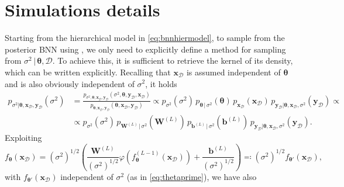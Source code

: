 \documentclass[a4paper, 11pt, reqno]{amsart}
\theoremstyle{plain}
\theoremstyle{remark}
\theoremstyle{definition}
\newcommand{\given}{\, | \,}
\newcommand{\train}{\mathcal{D}}
\begin{document}
\section{Simulations details} \label{sec:simulationsdetails}

Starting from the hierarchical model in \cref{eq:bnnhiermodel}, to sample from the posterior BNN using , we only need to explicitly define a method for sampling from $\sigma^2 \given \bm{\theta}, \train$. 
To achieve this, it is sufficient to retrieve the kernel of its density, which can be written explicitly. 
Recalling that $\bm{x}_{\mathcal{D}}$ is assumed independent of $\bm{\theta}$ and is also obviously independent of $\sigma^2$, it holds
\begin{equation} \label{eq:conditionaldistsigmaprod}
	\begin{aligned}
		p_{\sigma^2 | \bm{\theta}, \bm{x}_{\mathcal{D}}, \bm{y}_{\mathcal{D}}}(\sigma^2) & = \frac{p_{\sigma^2, \bm{\theta}, \bm{x}_{\mathcal{D}}, \bm{y}_{\mathcal{D}}}(\sigma^2, \bm{\theta}, \bm{y}_{\mathcal{D}}, \bm{x}_{\mathcal{D}})}{p_{\bm{\theta}, \bm{x}_{\mathcal{D}}, \bm{y}_{\mathcal{D}}}(\bm{\theta}, \bm{x}_{\mathcal{D}}, \bm{y}_{\mathcal{D}})} \propto p_{\sigma^2}(\sigma^2) \, p_{\bm{\theta} \given \sigma^2}(\bm{\theta}) \, p_{\bm{x}_{\mathcal{D}}}(\bm{x}_{\mathcal{D}}) \, p_{\bm{y}_{\mathcal{D}} | \bm{\theta}, \bm{x}_{\mathcal{D}}, \sigma^2}(\bm{y}_{\mathcal{D}}) \propto \\
		& \propto p_{\sigma^2}(\sigma^2) \, p_{\bm{W}^{(L)} \given \sigma^2}\left(\bm{W}^{(L)}\right) \, p_{\bm{b}^{(L)} \given \sigma^2}\left(\bm{b}^{(L)}\right) \,  p_{\bm{y}_{\mathcal{D}} | \bm{\theta}, \bm{x}_{\mathcal{D}}, \sigma^2}(\bm{y}_{\mathcal{D}}).
	\end{aligned}
\end{equation}
Exploiting
\begin{equation*}
	f_{\bm{\theta}}(\bm{x}_{\mathcal{D}}) = \left(\sigma^2\right)^{1/2} \left(\frac{\bm{W}^{(L)}}{\left(\sigma^2\right)^{1/2}} \varphi\left(f^{(L - 1)}_{\bm{\theta}}(\bm{x}_{\mathcal{D}})\right) + \frac{\bm{b}^{(L)}}{\left(\sigma^2\right)^{1/2}}\right) \eqcolon \left(\sigma^2\right)^{1/2} f_{\bm{\theta}'}(\bm{x}_{\mathcal{D}}),
\end{equation*}
with $f_{\bm{\theta}'}(\bm{x}_{\mathcal{D}})$ independent of $\sigma^2$ (as in \cref{eq:thetaprime}), we have also
\end{document}
